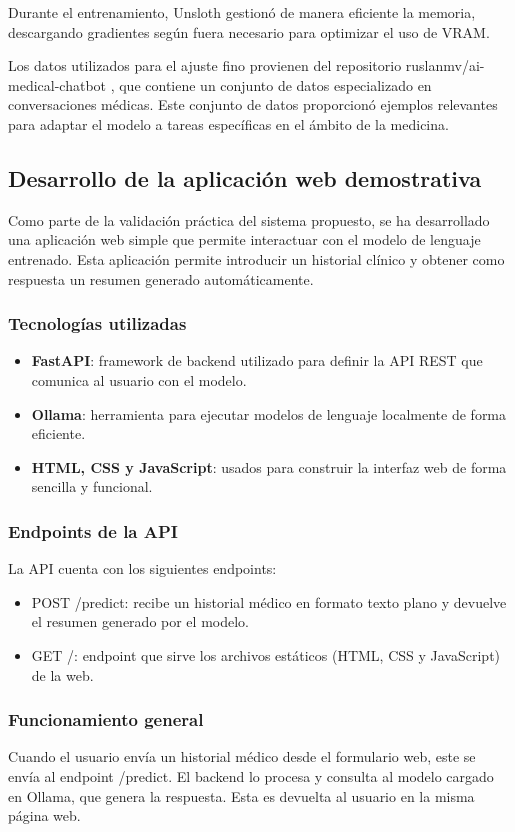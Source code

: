 \documentclass[../main.tex]{subfiles}
\begin{document}
Durante el entrenamiento, Unsloth gestionó de manera eficiente la memoria, descargando gradientes según fuera necesario para optimizar el uso de VRAM.

Los datos utilizados para el ajuste fino provienen del repositorio ruslanmv/ai-medical-chatbot \parencite{ruslanmv2024aimedchatbot}, que contiene un conjunto de datos especializado en conversaciones médicas. Este conjunto de datos proporcionó ejemplos relevantes para adaptar el modelo a tareas específicas en el ámbito de la medicina.



\subsection{Desarrollo de la aplicación web demostrativa}

Como parte de la validación práctica del sistema propuesto, se ha desarrollado una aplicación web simple que permite interactuar con el modelo de lenguaje entrenado. Esta aplicación permite introducir un historial clínico y obtener como respuesta un resumen generado automáticamente.

\subsubsection{Tecnologías utilizadas}

\begin{itemize}
    \item \textbf{FastAPI}: framework de backend utilizado para definir la API REST que comunica al usuario con el modelo.
    \item \textbf{Ollama}: herramienta para ejecutar modelos de lenguaje localmente de forma eficiente.
    \item \textbf{HTML, CSS y JavaScript}: usados para construir la interfaz web de forma sencilla y funcional.
\end{itemize}

\subsubsection{Endpoints de la API}

La API cuenta con los siguientes endpoints:

\begin{itemize}
    \item POST /predict: recibe un historial médico en formato texto plano y devuelve el resumen generado por el modelo.
    \item GET /: endpoint que sirve los archivos estáticos (HTML, CSS y JavaScript) de la web.
\end{itemize}

\subsubsection{Funcionamiento general}

Cuando el usuario envía un historial médico desde el formulario web, este se envía al endpoint /predict. El backend lo procesa y consulta al modelo cargado en Ollama, que genera la respuesta. Esta es devuelta al usuario en la misma página web.
\end{document}
